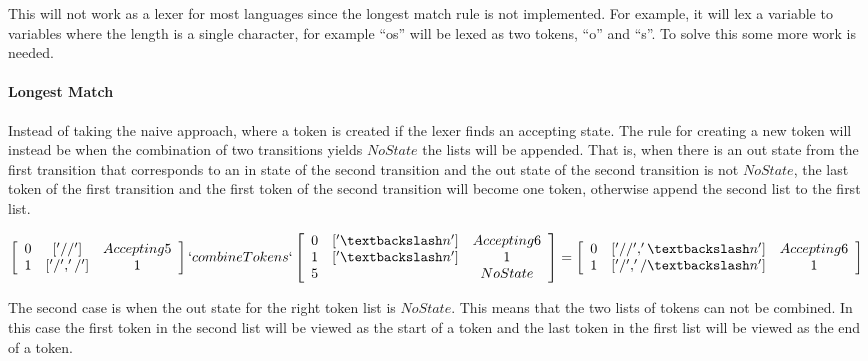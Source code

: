 This will not work as a lexer for most languages since the longest match rule is
not implemented. For example, it will lex a variable to variables where the
length is a single character, for example ``os'' will be lexed as two tokens,
``o'' and ``s''. To solve this some more work is needed.

\paragraph{Longest Match}\label{longmatch}
Instead of taking the naive approach, where a token is created if the lexer finds an
accepting state. The rule for creating a new token will instead be when the
combination of two transitions yields $NoState$ the lists will be appended. That
is, when there is an out state from the first transition that corresponds to an
in state of the second transition and the out state of the second transition
is not $NoState$, the last token of the first transition and the first token of
the second transition will become one token, otherwise append the second list to
the first list.
\begin{center}
$\left[\begin{array}{ccc}
0&['//']& Accepting 5\\
1&['/', '/'] &1\\
\end{array}\right] `combineTokens` 
\left[\begin{array}{ccc}
0&['\textbackslash n']&Accepting 6\\
1&['\textbackslash n']&1\\
5& &NoState\\
\end{array}\right] =
\left[\begin{array}{ccc}
0&['//','\textbackslash n']&Accepting 6\\
1&['/','/\textbackslash n']&1\\
\end{array}\right]$
\end{center}
The second case is when the out state for the right token list is $NoState$.
This means that the two lists of tokens can not be combined. In this case the
first token in the second list will be viewed as the start of a token and the
last token in the first list will be viewed as the end of a token.                                                                                               

